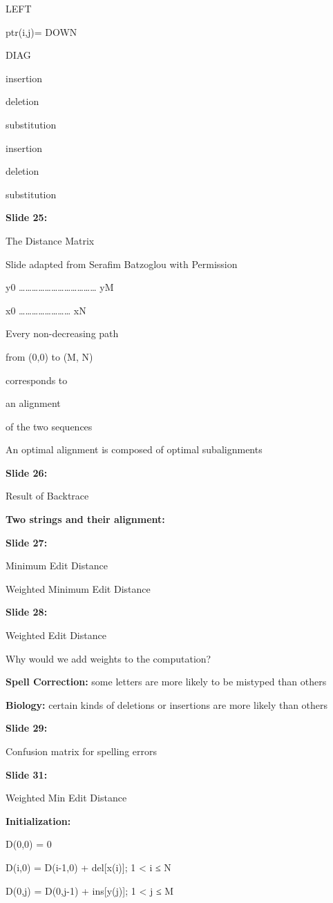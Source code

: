 \documentclass[11pt,a4paper]{article}
\begin{document}
LEFT

ptr(i,j)=   DOWN

DIAG

insertion

deletion

substitution

insertion

deletion

substitution

\textbf{Slide 25:}

The Distance Matrix

Slide adapted from Serafim Batzoglou with Permission

y0 ………………………………  yM

x0 ……………………  xN

Every non-decreasing path

from (0,0) to (M, N)

corresponds to

an alignment

of the two sequences

An optimal alignment is composed of optimal subalignments

\textbf{Slide 26:}

Result of Backtrace

\textbf{Two strings and their alignment:} 

\textbf{Slide 27:}

Minimum Edit Distance

Weighted Minimum Edit Distance

\textbf{Slide 28:}

Weighted Edit Distance

Why would we add weights to the computation?

\textbf{Spell Correction:}  some letters are more likely to be mistyped than others

\textbf{Biology:}  certain kinds of deletions or insertions are more likely than others

\textbf{Slide 29:}

Confusion matrix for spelling errors

\textbf{Slide 31:}

Weighted Min Edit Distance

\textbf{Initialization:} 

D(0,0) = 0

D(i,0) = D(i-1,0) + del[x(i)];    1 < i ≤ N

D(0,j) = D(0,j-1) + ins[y(j)];    1 < j ≤ M
\end{document}
